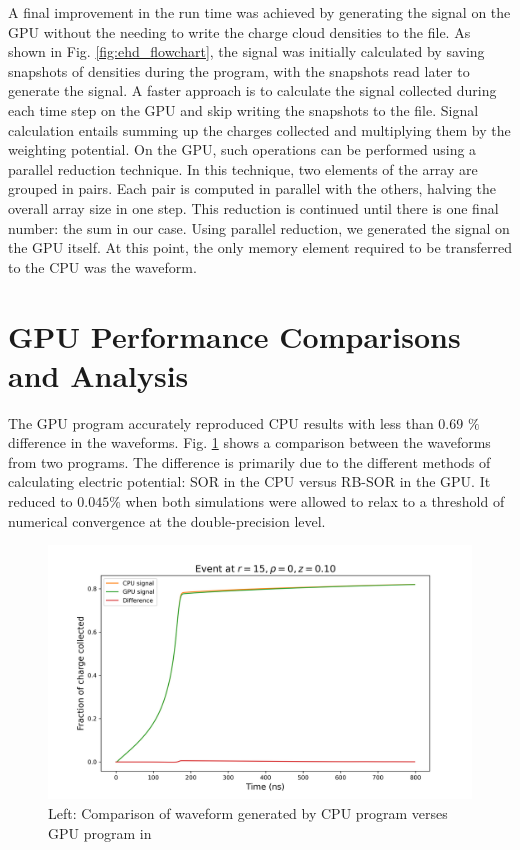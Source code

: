 A final improvement in the run time was achieved by generating the signal on the GPU without the needing to write the charge cloud densities to the file. As shown in Fig. \ref{fig:ehd_flowchart}, the signal was initially calculated by saving snapshots of densities during the program, with the snapshots read later to generate the signal. A faster approach is to calculate the signal collected during each time step on the GPU and skip writing the snapshots to the file. Signal calculation entails summing up the charges collected and multiplying them by the weighting potential. On the GPU, such operations can be performed using a parallel reduction technique. In this technique, two elements of the array are grouped in pairs. Each pair is computed in parallel with the others, halving the overall array size in one step. This reduction is continued until there is one final number: the sum in our case. Using parallel reduction, we generated the signal on the GPU itself. At this point, the only memory element required to be transferred to the CPU was the waveform.

\section{GPU Performance Comparisons and Analysis}

The GPU program accurately reproduced CPU results with less than 0.69 $\%$ difference in the waveforms. Fig. \ref{fig:waveform_comp} shows a comparison between the waveforms from two programs. The difference is primarily due to the different methods of calculating electric potential: SOR in the CPU versus RB-SOR in the GPU. It reduced to $0.045\%$ when both simulations were allowed to relax to a threshold of numerical convergence at the double-precision level.

\begin{figure}[!ht]
\centering
 \includegraphics[width=0.99\linewidth]{ch4/figs/cpu_gpu_wf.png}
\caption{ Left: Comparison of waveform generated by CPU program verses GPU program in {\tdsim}}
\label{fig:waveform_comp}
\end{figure}


